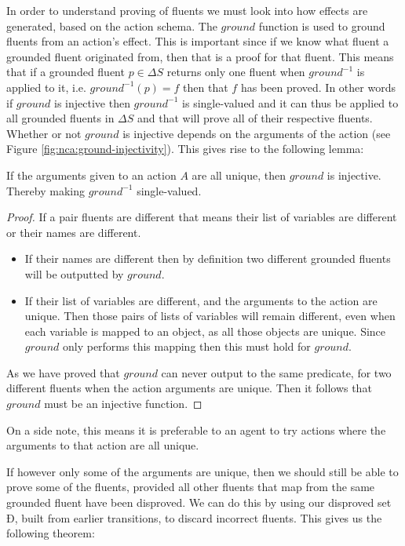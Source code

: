 \documentclass[../Master.tex]{subfiles}
\begin{document}
In order to understand proving of fluents we must look into how effects are generated, based on the action schema.
The $ground$ function is used to ground fluents from an action's effect. This is important since if we know what fluent a grounded fluent originated from, then that is a proof for that fluent. This means that if a grounded fluent $p \in \Delta S$ returns only one fluent when $ground^{-1}$ is applied to it, i.e. $ground^{-1}(p) = {f}$ then that $f$ has been proved. In other words if $ground$ is injective then $ground^{-1}$ is single-valued and it can thus be applied to all grounded fluents in $\Delta S$ and that will prove all of their respective fluents.
Whether or not $ground$ is injective depends on the arguments of the action (see Figure \ref*{fig:nca:ground-injectivity}).
This gives rise to the following lemma:
\begin{lemma}
If the arguments given to an action $A$ are all unique, then $ground$ is injective. Thereby making $ground^{-1}$ single-valued.

\begin{proof}
	If a pair fluents are different that means their list of variables are different or their names are different. 
	\begin{itemize}
		\item If their names are different then by definition two different grounded fluents will be outputted by $ground$.
		
		\item If their list of variables are different, and the arguments to the action are unique. Then those pairs of lists of variables will remain different, even when each variable is mapped to an object, as all those objects are unique. Since $ground$ only performs this mapping then this must hold for $ground$.
	\end{itemize}	
	As we have proved that $ground$ can never output to the same predicate, for two different fluents when the action arguments are unique. Then it follows that $ground$ must be an injective function. 
\end{proof}
\end{lemma}

On a side note, this means it is preferable to an agent to try actions where the arguments to that action are all unique. 

If however only some of the arguments are unique, then we should still be able to prove some of the fluents, provided all other fluents that map from the same grounded fluent have been disproved. We can do this by using our disproved set $Ð$, built from earlier transitions, to discard incorrect fluents. This gives us the following theorem: 
\end{document}
